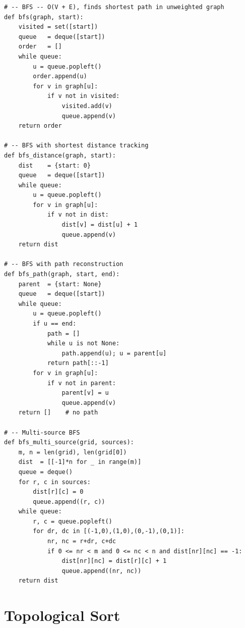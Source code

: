 \documentclass[11pt,a4paper]{report}
\begin{document}
\begin{lstlisting}
# -- BFS -- O(V + E), finds shortest path in unweighted graph
def bfs(graph, start):
    visited = set([start])
    queue   = deque([start])
    order   = []
    while queue:
        u = queue.popleft()
        order.append(u)
        for v in graph[u]:
            if v not in visited:
                visited.add(v)
                queue.append(v)
    return order

# -- BFS with shortest distance tracking
def bfs_distance(graph, start):
    dist    = {start: 0}
    queue   = deque([start])
    while queue:
        u = queue.popleft()
        for v in graph[u]:
            if v not in dist:
                dist[v] = dist[u] + 1
                queue.append(v)
    return dist

# -- BFS with path reconstruction
def bfs_path(graph, start, end):
    parent  = {start: None}
    queue   = deque([start])
    while queue:
        u = queue.popleft()
        if u == end:
            path = []
            while u is not None:
                path.append(u); u = parent[u]
            return path[::-1]
        for v in graph[u]:
            if v not in parent:
                parent[v] = u
                queue.append(v)
    return []    # no path

# -- Multi-source BFS
def bfs_multi_source(grid, sources):
    m, n = len(grid), len(grid[0])
    dist  = [[-1]*n for _ in range(m)]
    queue = deque()
    for r, c in sources:
        dist[r][c] = 0
        queue.append((r, c))
    while queue:
        r, c = queue.popleft()
        for dr, dc in [(-1,0),(1,0),(0,-1),(0,1)]:
            nr, nc = r+dr, c+dc
            if 0 <= nr < m and 0 <= nc < n and dist[nr][nc] == -1:
                dist[nr][nc] = dist[r][c] + 1
                queue.append((nr, nc))
    return dist
\end{lstlisting}

\section{Topological Sort}
\end{document}
